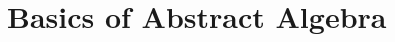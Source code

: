 \chapterspaceabove{6.75cm} 
\chapterspacebelow{7.25cm} 
\chapter{Basics of Abstract Algebra}
\lipsum